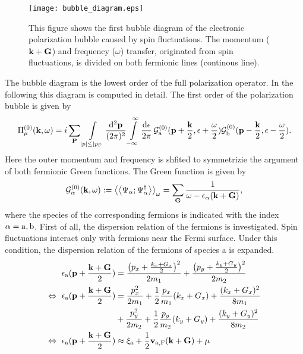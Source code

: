 %
\begin{figure}[t]
	\centering
	\texttt{[image: bubble\_diagram.eps]}
	\caption{
This figure shows the first bubble diagram of the electronic polarization bubble caused by spin fluctuations.
The momentum ($\vb{k}+\vb{G}$) and frequency ($\omega$) transfer, originated from spin fluctuations, is divided on both fermionic lines (continous line).
	}
	\label{fig:bubble diagram}
\end{figure}
%
The bubble diagram is the lowest order of the full polarization operator.
In the following this diagram is computed in detail.
The first order of the polarization bubble is given by
%
\begin{align}
	\Pi_{\mu}^{(0)}(\vb{k}, \omega) = 
		i 
		\sum\limits_{\vb{P}}
		\int\limits_{|p| \leq |p_{\mathrm{F}}} \frac{\dd[2]{\vb{p}}}{(2\pi)^{2}} 
		\int\limits_{-\infty}^{\infty} \frac{\dd{\epsilon}}{2\pi}\,
		\mathcal{G}_{\mathrm{a}}^{(0)}(\vb{p}+\frac{\vb{k}}{2}, \epsilon+\frac{\omega}{2})
		\mathcal{G}_{\mathrm{b}}^{(0)}(\vb{p}-\frac{\vb{k}}{2}, \epsilon-\frac{\omega}{2}).
\end{align}
%
Here the outer momentum and frequency is shfited to symmetrizie the argument of both fermionic Green functions.
The Green function is given by
%
\begin{align}
	 \mathcal{G}_{\alpha}^{(0)}(\vb{k},\omega) := \big\langle\big\langle{\Psi_{\alpha}};{\Psi_{\alpha}^{\dag}}\big\rangle\big\rangle_{\omega} = \sum\limits_{\vb{G}} \frac{1}{\omega - \epsilon_{\alpha}(\vb{k}+\vb{G})}, 
	 \label{appeq:free electron propagator}
\end{align}
%
where the species of the corresponding fermions is indicated with the index $\alpha = \mathrm{a},\mathrm{b}$.
First of all, the dispersion relation of the fermions is investigated.
Spin fluctuations interact only with fermions near the Fermi surface.
Under this condition, the dispersion relation of the fermions of species a is expanded.
%
\begin{align}
	\epsilon_{\mathrm{a}}(\vb{p} + \frac{\vb{k} + \vb{G}}{2}) &= 
		\frac{\big(p_{x} + \frac{k_{x} + G_{x}}{2}\big)^{2}}{2m_{1}} 
		+ 
		\frac{\big(p_{y} + \frac{k_{y} + G_{y}}{2}\big)^{2}}{2m_{2}} 
		\notag \\ 
	\Leftrightarrow\ \epsilon_{\mathrm{a}}(\vb{p} + \frac{\vb{k} + \vb{G}}{2}) &=
		\frac{p_{x}^{2}}{2m_{1}} + \frac{1}{2} \frac{p_{x}}{m_{1}}(k_{x}+G_{x}) + \frac{(k_{x}+G_{x})^{2}}{8m_{1}}
		\notag \\ &+
		\frac{p_{y}^{2}}{2m_{2}} + \frac{1}{2} \frac{p_{y}}{m_{2}}(k_{y}+G_{y}) + \frac{(k_{y}+G_{y})^{2}}{8m_{2}}
		\notag \\
	\Leftrightarrow\ \epsilon_{\mathrm{a}}(\vb{p} + \frac{\vb{k} + \vb{G}}{2}) &\approx
		\xi_{\mathrm{a}} + \frac{1}{2} \vb{v}_{\mathrm{a,F}}(\vb{k} + \vb{G}) + \mu
\end{align} 
